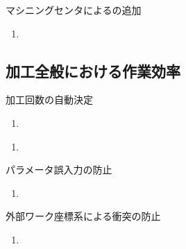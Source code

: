 \begin{Issues}{マシニングセンタによる\EndFaceChamferMilling の追加\TBW}
\begin{enumerate}[label=\sarrow]
\item[{\sarrow[red]}]
\end{enumerate}
\end{Issues}


\subsection{加工全般における作業効率}

\begin{Issues}{加工回数の自動決定\TBW}
\begin{enumerate}[label=\sarrow]
\item[{\sarrow[red]}]
\end{enumerate}
\end{Issues}

\begin{Issues}{\TBW}
\begin{enumerate}[label=\sarrow]
\item[{\sarrow[red]}]
\end{enumerate}
\end{Issues}


\clearpage

\begin{Issues}{パラメータ誤入力の防止\TBW}
\begin{enumerate}[label=\sarrow]
\item[{\sarrow[red]}]
\end{enumerate}
\end{Issues}

\begin{Issues}{\KeywayMilling{} 外部ワーク座標系による衝突の防止\TBW}
\begin{enumerate}[label=\sarrow]
\item[{\sarrow[red]}]
\end{enumerate}
\end{Issues}



